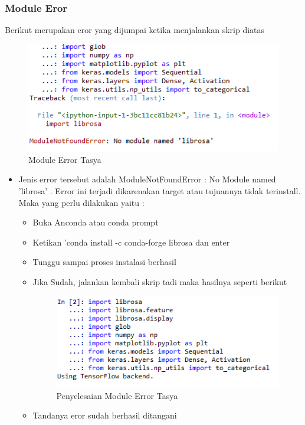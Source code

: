 \subsubsection{Module Eror}
Berikut merupakan eror yang dijumpai ketika menjalankan skrip diatas
\begin{figure}[ht]
\centering
\includegraphics[scale=0.5]{figures/chapter6eror.png}
\caption{Module Error Tasya}
\label{Error}
\end{figure}
\begin{itemize}
\item Jenis error tersebut adalah ModuleNotFoundError : No Module named 'librosa' . Error ini terjadi dikarenakan target atau tujuannya tidak terinstall. Maka yang perlu dilakukan yaitu :
\begin{itemize}
\item Buka Anconda atau conda prompt
\item Ketikan 'conda install -c conda-forge librosa dan enter
\item Tunggu sampai proses instalasi berhasil
\item Jika Sudah, jalankan kembali skrip tadi maka hasilnya seperti berikut
\begin{figure}[ht]
\centering
\includegraphics[scale=0.5]{figures/chapter6eror1.png}
\caption{Penyelesaian Module Error Tasya}
\label{Error}
\end{figure}
\item Tandanya eror sudah berhasil ditangani
\end{itemize}
\end{itemize}






